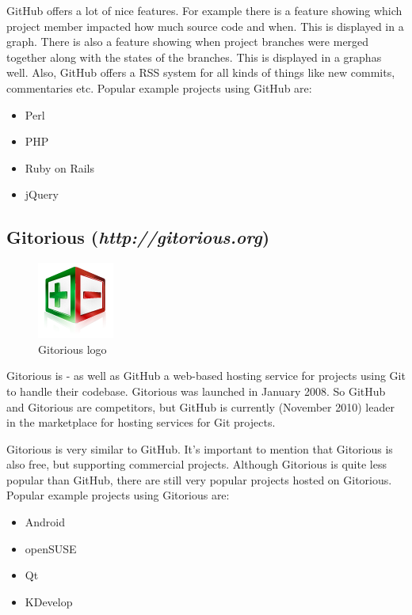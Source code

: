 GitHub offers a lot of nice features. For example there is a feature showing which project member impacted how much source code and when. This is displayed in a graph. There is also a feature showing when project branches were merged together along with the states of the branches. This is displayed in a graphas well. Also, GitHub offers a RSS system for all kinds of things like new commits, commentaries etc.
\newline
Popular example projects using GitHub are:
\newline
\begin{itemize}
	\item Perl
	\item PHP
	\item Ruby on Rails
	\item jQuery
\end{itemize}

\subsection{Gitorious (\textit{http://gitorious.org})}
\begin{figure}[h]
  \centering 
  \includegraphics{img/gitorious}
  \caption{Gitorious logo}
  \label{}
\end{figure}
Gitorious is - as well as GitHub a web-based hosting service for projects using Git to handle their codebase. Gitorious was launched in January 2008. So GitHub and Gitorious are competitors, but GitHub is currently (November 2010) leader in the marketplace for hosting services for Git projects.

Gitorious is very similar to GitHub. It's important to mention that Gitorious is also free, but supporting commercial projects. Although Gitorious is quite less popular than GitHub, there are still very popular projects hosted on Gitorious.
\newline
Popular example projects using Gitorious are:
\begin{itemize}
	\item Android
	\item openSUSE
	\item Qt
	\item KDevelop
\end{itemize}


